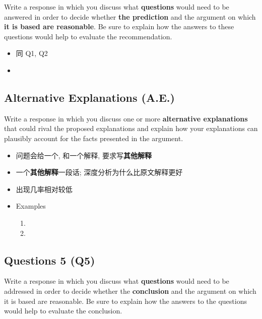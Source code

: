     Write a response in which you discuss what \textbf{questions} would need
    to be answered in order to decide whether \textbf{the prediction} and
    the argument on which \textbf{it is based are reasonable}.
    Be sure to explain how the answers to these questions would help to
    evaluate the recommendation.

    \begin{itemize}
      \item 同 Q1, Q2
      \item {}
    \end{itemize}

  \subsection{Alternative Explanations (A.E.)}

    Write a response in which you discuss one or more
    \textbf{alternative explanations} that could rival the proposed
    explanations and explain how your explanations can plausibly account for
    the facts presented in the argument.

    \begin{itemize}
      \item 问题会给一个, 和一个解释, 要求写\textbf{其他解释}
      \item 一个\textbf{其他解释}一段话; 深度分析为什么比原文解释更好
      \item 出现几率相对较低
      \item Examples
      \begin{enumerate}
        \item {}
        \item {}
      \end{enumerate}
    \end{itemize}

  \subsection{Questions 5 (Q5)}

    Write a response in which you discuss what \textbf{questions} would need
    to be addressed in order to decide whether the \textbf{conclusion} and the
    argument on which it is based are reasonable. Be sure to explain how the
    answers to the questions would help to evaluate the conclusion.

